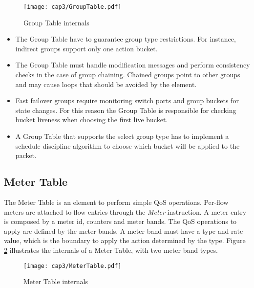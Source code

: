 	\begin{figure}[h!]
    \centering
    \texttt{[image: cap3/GroupTable.pdf]}
    \caption{Group Table internals}
    \label{fig:grouptable}
    \end{figure}

	\begin{itemize}
	
	\item The Group Table have to guarantee group type restrictions. For instance, indirect groups support only one action bucket. 

	\item The Group Table must handle modification messages and perform consistency checks in the case of group chaining. Chained groups point to other groups and may cause loops that should be avoided by the element.  

	\item Fast failover groups require monitoring switch ports and group buckets for state changes. For this reason the Group Table is responsible for checking bucket liveness when choosing the first live bucket.

	\item A Group Table that supports the select group type has to implement a schedule discipline algorithm to choose which bucket will be applied to the packet.

	\end{itemize}

	\subsection{Meter Table}
	\label{sec:MeterTable}

    The Meter Table is an element to perform simple QoS operations. Per-flow meters are attached to flow entries through the \textit{Meter} instruction. A meter entry is composed by a meter id, counters and meter bands. The QoS operations to apply are defined by the meter bands. A meter band must have a type and rate value, which is the boundary to apply the action determined by the type. Figure \ref{fig:metertable} illustrates the internals of a Meter Table, with two meter band types.   

    \begin{figure}[h!]
    \centering
    \texttt{[image: cap3/MeterTable.pdf]}
    \caption{Meter Table internals}
    \label{fig:metertable}
    \end{figure}


